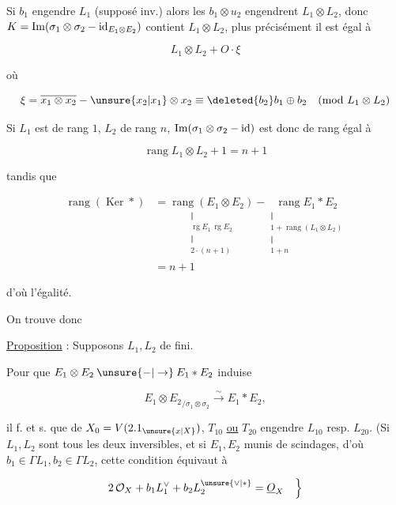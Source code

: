 

Si $b_1$  engendre $L_1$ (supposé inv.) alors les $b_1\otimes u_2$ engendrent $L_1\otimes L_2$, donc  $K=\operatorname{Im}(\sigma_1\otimes\sigma_2-{\rm id}_{E_1\otimes E_2})$ contient $L_1\otimes L_2$, plus précisément il est égal à

\[ L_1\otimes L_2+O\cdot\xi \]

où

\[ \xi=\overline{x_1\otimes x_2}-\unsure{x_2|x_1}\otimes x_2\equiv\deleted{b_2}b_1\oplus b_2\quad(\text{mod }L_1\otimes L_2) \]


Si $L_1$ est de rang $1$, $L_2$ de rang $n$, $\operatorname{Im}(\sigma_1\otimes\sigma_2-{\rm id})$ est donc de rang  égal à

\[ \operatorname{rang} L_1\otimes L_2+1=n+1 \]

tandis que

\[ \begin{aligned}\operatorname{rang}(\operatorname{Ker} *)&=\underset{\substack{\Vert\\\operatorname{rg} E_1\,\operatorname{rg} E_2\\\Vert\\2\cdot(n+1)}}{\operatorname{rang}(E_1\otimes E_2)}-\underset{\substack{\Vert\\1+\operatorname{rang}(L_1\otimes L_2)\\\Vert\\1+n}}{\operatorname{rang} E_1*E_2}\\ &=n+1\end{aligned} \]

d'où l'égalité.

On trouve donc

\uline{Proposition} : Supposons  $L_1,L_2$ de   fini.

Pour que $E_1\otimes E_2\mathbin{\unsure{-|\to}}E_1*E_2$ induise

\[ {E_1\otimes E_2}_{/\sigma_1\otimes\sigma_2}\xrightarrow{\sim}E_1*E_2, \]

il f. et s. que    de $X_0=V(2.1_{\unsure{x|X}})$, $T_{10}$ \uline{ou} $T_{20}$ engendre $L_{10}$ resp. $L_{20}$. (Si $L_1,L_2$ sont tous les deux inversibles, et si $E_1,E_2$ munis de scindages, d'où $b_1\in\Gamma L_1,b_2\in\Gamma L_2$, cette condition équivaut à

\[ 2\,\mathcal O_X+b_1L_1^\vee+b_2 L_2^{\unsure{\vee|*}}=\underline O_X\quad\Bigr\} \]
